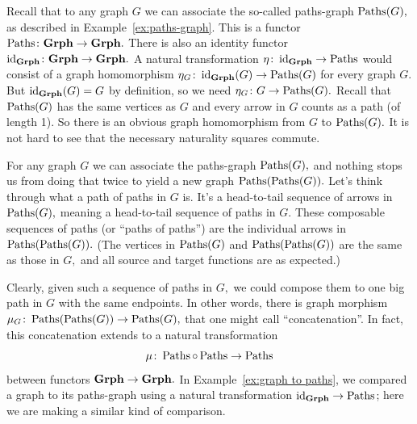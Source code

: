 \documentclass[../main/CT4S-EN-RU]{subfiles}
\begin{document}
\begin{exampleRUS}
\end{exampleRUS}

\begin{exampleENG}\label{ex:graph to paths}
Recall that to any graph $G$ we can associate the so-called paths-graph $\operatorname{Paths}(G),$ as described in Example~\ref{ex:paths-graph}. This is a functor $\operatorname{Paths}\colon{\mathbf{Grph}}\rightarrow{\mathbf{Grph}}.$ There is also an identity functor $\operatorname{id}_{{\mathbf{Grph}}}\colon{\mathbf{Grph}}\rightarrow{\mathbf{Grph}}.$ A natural transformation $\eta\colon\operatorname{id}_{\mathbf{Grph}}\rightarrow\operatorname{Paths}$ would consist of a graph homomorphism $\eta_G\colon \operatorname{id}_{\mathbf{Grph}}(G)\rightarrow\operatorname{Paths}(G)$ for every graph $G.$ But $\operatorname{id}_{\mathbf{Grph}}(G)=G$ by definition, so we need $\eta_G\colon G\rightarrow\operatorname{Paths}(G).$ Recall that $\operatorname{Paths}(G)$ has the same vertices as $G$ and every arrow in $G$ counts as a path (of length 1). So there is an obvious graph homomorphism from $G$ to $\operatorname{Paths}(G).$ It is not hard to see that the necessary naturality squares commute.
\end{exampleENG}

\begin{exampleRUS}\label{ex:graph to paths}
\end{exampleRUS}

\begin{exampleENG}\label{ex:concat paths of paths}
For any graph $G$ we can associate the paths-graph $\operatorname{Paths}(G),$ and nothing stops us from doing that twice to yield a new graph $\operatorname{Paths}(\operatorname{Paths}(G)).$ Let's think through what a path of paths in $G$ is. It's a head-to-tail sequence of arrows in $\operatorname{Paths}(G),$ meaning a head-to-tail sequence of paths in $G.$ These composable sequences of paths (or “paths of paths”) are the individual arrows in $\operatorname{Paths}(\operatorname{Paths}(G)).$ (The vertices in $\operatorname{Paths}(G)$ and $\operatorname{Paths}(\operatorname{Paths}(G))$ are the same as those in $G,$ and all source and target functions are as expected.)

Clearly, given such a sequence of paths in $G,$ we could compose them to one big path in $G$ with the same endpoints. In other words, there is graph morphism $\mu_G\colon\operatorname{Paths}(\operatorname{Paths}(G))\rightarrow\operatorname{Paths}(G),$ that one might call “concatenation”. In fact, this concatenation extends to a natural transformation $$\mu\colon\operatorname{Paths}\circ\operatorname{Paths}\rightarrow\operatorname{Paths}$$ between functors ${\mathbf{Grph}}\rightarrow{\mathbf{Grph}}.$ In Example~\ref{ex:graph to paths}, we compared a graph to its paths-graph using a natural transformation $\operatorname{id}_{{\mathbf{Grph}}}\rightarrow\operatorname{Paths}$; here we are making a similar kind of comparison.
\end{exampleENG}
\end{document}
